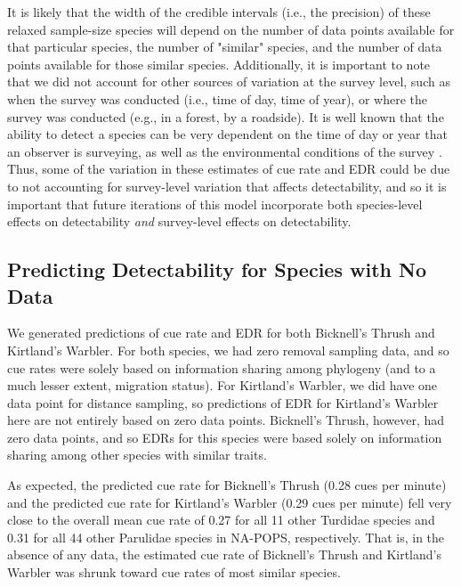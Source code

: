 \documentclass[12pt]{article}
\begin{document}
\par It is likely that the width of the credible intervals (i.e., the precision) of these relaxed sample-size species will depend on the number of data points available for that particular species, the number of "similar" species, and the number of data points available for those similar species.
Additionally, it is important to note that we did not account for other sources of variation at the survey level, such as when the survey was conducted (i.e., time of day, time of year), or where the survey was conducted (e.g., in a forest, by a roadside).
It is well known that the ability to detect a species can be very dependent on the time of day or year that an observer is surveying, as well as the environmental conditions of the survey \citep{edwards_point_2023}.
Thus, some of the variation in these estimates of cue rate and EDR could be due to not accounting for survey-level variation that affects detectability, and so it is important that future iterations of this model incorporate both species-level effects on detectability \textit{and} survey-level effects on detectability.

\subsection{Predicting Detectability for Species with No Data}

\par We generated predictions of cue rate and EDR for both Bicknell’s Thrush and Kirtland’s Warbler.
For both species, we had zero removal sampling data, and so cue rates were solely based on information sharing among phylogeny (and to a much lesser extent, migration status). 
For Kirtland’s Warbler, we did have one data point for distance sampling, so predictions of EDR for Kirtland’s Warbler here are not entirely based on zero data points.
Bicknell’s Thrush, however, had zero data points, and so EDRs for this species were based solely on information sharing among other species with similar traits.

\par As expected, the predicted cue rate for Bicknell’s Thrush (0.28 cues per minute) and the predicted cue rate for Kirtland’s Warbler (0.29 cues per minute) fell very close to the overall mean cue rate of 0.27 for all 11 other Turdidae species and 0.31 for all 44 other Parulidae species in NA-POPS, respectively. 
That is, in the absence of any data, the estimated cue rate of Bicknell’s Thrush and Kirtland’s Warbler was shrunk toward cue rates of most similar species.
\end{document}

